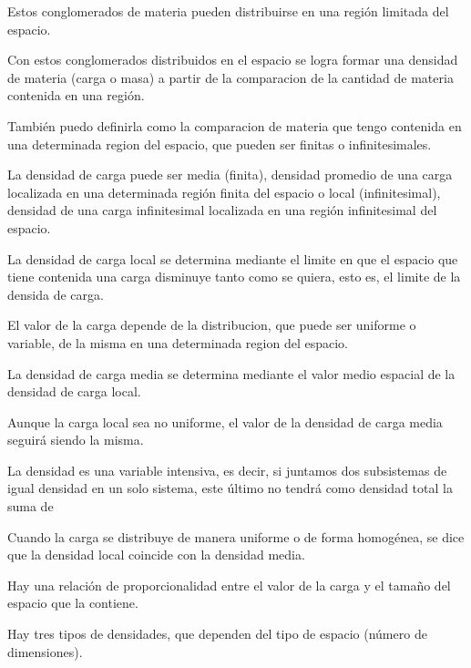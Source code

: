\documentclass[a4paper,10pt]{article}
\begin{document}
Estos conglomerados de materia pueden distribuirse en una regi\'on limitada del espacio.

Con estos conglomerados distribuidos en el espacio se logra formar una densidad de materia (carga o masa)
a partir de la comparacion de la cantidad de materia contenida en una regi\'on.

Tambi\'en puedo definirla como la comparacion de materia que tengo contenida en una determinada region del
espacio, que pueden ser finitas o infinitesimales.

La densidad de carga puede ser media (finita), densidad promedio de una carga localizada en una determinada regi\'on finita del espacio
o local (infinitesimal), densidad de una carga infinitesimal localizada en una regi\'on infinitesimal del espacio.

La densidad de carga local se determina mediante el limite en que el espacio que tiene contenida una carga
disminuye tanto como se quiera, esto es, el limite de la densida de carga.

El valor de la carga depende de la distribucion, que puede ser uniforme o variable, de la misma en una
determinada region del espacio.

La densidad de carga media se determina mediante el valor medio espacial de la densidad de carga local.

Aunque la carga local sea no uniforme, el valor de la densidad de carga media seguir\'a siendo la misma.

La densidad es una variable intensiva, es decir, si juntamos dos subsistemas de igual densidad en
un solo sistema, este \'ultimo no tendr\'a como densidad total la suma de 

Cuando la carga se distribuye de manera uniforme o de forma homog\'enea, se dice que la densidad local
coincide con la densidad media.

Hay una relaci\'on de proporcionalidad entre el valor de la carga y el tamaño del espacio que la contiene.

Hay tres tipos de densidades, que dependen del tipo de espacio (n\'umero de dimensiones).
\end{document}
